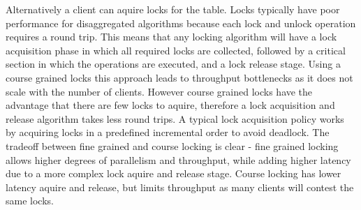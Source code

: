 Alternatively a client can aquire locks for the table. Locks
typically have poor performance for disaggregated algorithms
because each lock and unlock operation requires a round
trip. This means that any locking algorithm will have a lock
acquisition phase in which all required locks are collected,
followed by a critical section in which the operations are
executed, and a lock release stage. Using a course grained
locks this approach leads to throughput bottlenecks as it
does not scale with the number of clients. However course
grained locks have the advantage that there are few locks to
aquire, therefore a lock acquisition and release algorithm
takes less round trips. A typical lock acquisition policy
works by acquiring locks in a predefined incremental order to
avoid deadlock. The tradeoff between fine grained and course
locking is clear - fine grained locking allows higher
degrees of parallelism and throughput, while adding higher
latency due to a more complex lock aquire and release stage.
Course locking has lower latency aquire and release, but
limits throughput as many clients will contest the same
locks.

